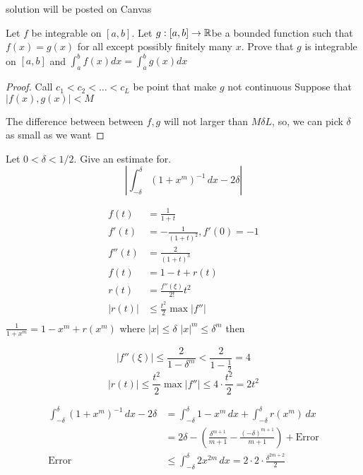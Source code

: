 \begin{question}{17}
  solution will be posted on Canvas
\end{question}

\begin{question}{18}
  Let $f$ be integrable on $[a,b]$. Let $g : [a,b] \to\mathbb R$be a bounded function
such that $f(x) = g(x)$ for all except possibly finitely many $x$. Prove that $g$
is integrable on $[a,b]$ and $\int_a^b f(x) dx = \int_a^b g(x) dx$ 
\end{question}

\begin{proof}
  Call $c_1 < c_2 < \dotsc < c_L$ be point that make $g$ not continuous
  Suppose that $|f(x), g(x)| < M$

  The difference between between $f, g$ will not larger than $M\delta L$, so, we can pick $\delta$ as small as we want

\end{proof}

\begin{question}{19}
  Let $0 < \delta < 1/2$. Give an estimate for.
  \[\left|\int_{-\delta}^{\delta} (1+x^m)^{-1}\, dx -2\delta\right|\] 
\end{question}

\begin{align*}
  f(t) &= \frac{1}{1+t}\\
  f'(t) &= -\frac{1}{(1+t)^2}, f'(0) = -1 \\
  f''(t) &= \frac{2}{(1+t)^3} \\
  f(t) &= 1 - t + r(t) \\
  r(t) &= \frac{f''(\xi)}{2!}t^2 \\
  |r(t)| &\le \frac{t^2}{2}\max|f''| \\
\end{align*}
$\frac{1}{1+x^m} = 1-x^m + r(x^m)$ where $|x| \le \delta$ $|x|^m \le \delta^m$ then 

\[|f''(\xi)| \le \frac{2}{1-\delta^m} < \frac{2}{1-\frac{1}{2}} = 4\]
\[|r(t)| \le \frac{t^2}{2}\max|f''| \le 4\cdot\frac{t^2}{2} = 2t^2 \]

\begin{align*}
  \int_{-\delta}^{\delta} (1+x^m)^{-1}\, dx -2\delta &= \int_{-\delta}^{\delta} 1-x^m \, dx +\int_{-\delta}^{\delta} r(x^m)\, dx \\
  &= 2\delta - \left(\frac{\delta^{m+1}}{m+1} - \frac{(-\delta)^{m+1}}{m+1}\right) + \text{Error} \\
  \text{Error} &\le \int_{-\delta}^{\delta} 2x^{2m}\, dx = 2\cdot 2\cdot\frac{\delta^{2m + 2}}{2} \\
\end{align*}

